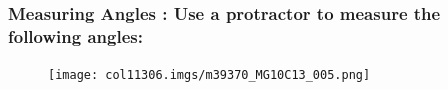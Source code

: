             \subsubsection{  Measuring Angles : Use a protractor to measure the following angles:}
            \nopagebreak
          \label{m39370*id314481}
    \setcounter{subfigure}{0}
	\begin{figure}[H] %
    \begin{center}
    \label{m39370*id314484!!!underscore!!!media}\label{m39370*id314484!!!underscore!!!printimage}\texttt{[image: col11306.imgs/m39370\_MG10C13\_005.png]} %
      \vspace{2pt}
    \vspace{.1in}
    \end{center}
 \end{figure}       
          \par 
      \label{m39370*uid17}
